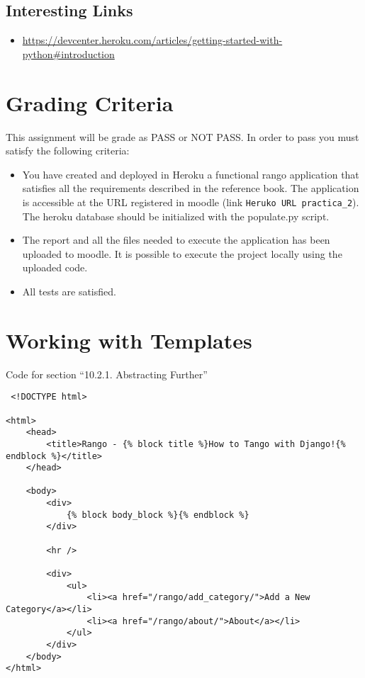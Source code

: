 \documentclass[12pt]{article} %
\begin{document}
\subsection{Interesting Links}

\begin{itemize}
 \item \url{https://devcenter.heroku.com/articles/getting-started-with-python#introduction}
\end{itemize}


\section{Grading Criteria}

This assignment will be grade as PASS or NOT PASS.
In order to pass you must satisfy the following criteria:

\begin{itemize}
 \item You have created and deployed in Heroku a functional rango application that satisfies all the requirements described in the reference book. The application is accessible at the URL registered in  moodle (link \texttt{Heruko URL practica\_2}). The heroku database should be initialized with the populate.py script.
 \item The report and all the files needed to execute the application has been uploaded to moodle. It is possible to execute the project locally using the uploaded code.
 \item All tests are satisfied.
\end{itemize}


\newpage
\appendix

\section{Working with Templates}
\label{app:workingWithTemplates}
Code for section ``10.2.1. Abstracting Further''

\begin{verbatim}
 <!DOCTYPE html>

<html>
    <head>
        <title>Rango - {% block title %}How to Tango with Django!{% endblock %}</title>
    </head>

    <body>
        <div>
            {% block body_block %}{% endblock %}
        </div>

        <hr />

        <div>
            <ul>
                <li><a href="/rango/add_category/">Add a New Category</a></li>
                <li><a href="/rango/about/">About</a></li>
            </ul>
        </div>
    </body>
</html>
\end{verbatim}
\end{document}
